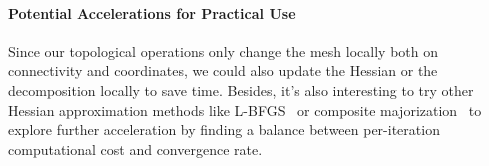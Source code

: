 \paragraph{Potential Accelerations for Practical Use}
Since our topological operations only change the mesh locally both on connectivity and coordinates, we could also update the Hessian or the decomposition locally to save time. Besides, it's also interesting to try other Hessian approximation methods like L-BFGS~\cite{Liu1989Limited} or composite majorization~\cite{Shtengel2017Geometric} to explore further acceleration by finding a balance between per-iteration computational cost and convergence rate.
